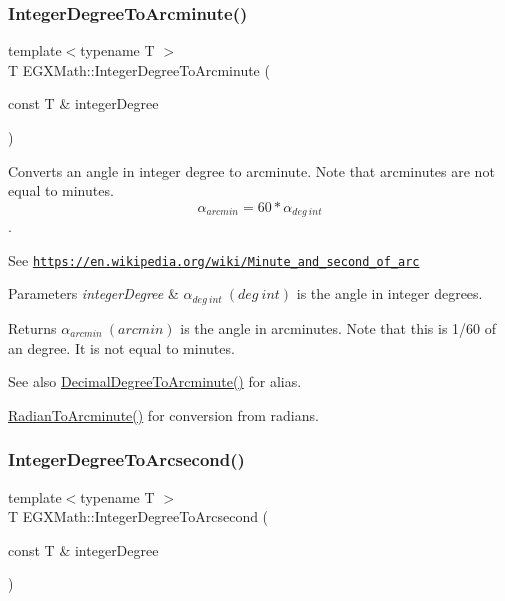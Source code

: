 \subsubsection{\texorpdfstring{Integer\+Degree\+To\+Arcminute()}{IntegerDegreeToArcminute()}}
{\footnotesize\ttfamily template$<$typename T $>$ \\
T E\+G\+X\+Math\+::\+Integer\+Degree\+To\+Arcminute (\begin{DoxyParamCaption}\item[{const T \&}]{integer\+Degree }\end{DoxyParamCaption})}



Converts an angle in integer degree to arcminute. Note that arcminutes are not equal to minutes. \[\alpha_{arcmin}= 60 * \alpha_{deg\ int}\]. 

See \href{https://en.wikipedia.org/wiki/Minute_and_second_of_arc}{\tt https\+://en.\+wikipedia.\+org/wiki/\+Minute\+\_\+and\+\_\+second\+\_\+of\+\_\+arc} 
\begin{DoxyParams}{Parameters}
{\em integer\+Degree} & $\alpha_{deg\ int}\ (deg\ int)$ is the angle in integer degrees. \\
\hline
\end{DoxyParams}
\begin{DoxyReturn}{Returns}
$\alpha_{arcmin}\ (arcmin)$ is the angle in arcminutes. Note that this is 1/60 of an degree. It is not equal to minutes. 
\end{DoxyReturn}
\begin{DoxySeeAlso}{See also}
\mbox{\hyperlink{group___e_g_x_math-_angle_conversions-_decimal_degree_ga6b6ea6e45d2a13f556824ca419cc9fbd}{Decimal\+Degree\+To\+Arcminute()}} for alias. 

\mbox{\hyperlink{group___e_g_x_math-_angle_conversions-_radian_ga722e3b8e78540a6b3942b73b64aeb8d2}{Radian\+To\+Arcminute()}} for conversion from radians. 
\end{DoxySeeAlso}
\mbox{\label{group___e_g_x_math-_angle_conversions-_integer_degree_gaa04058a2fea3dc3678264a05fac6e1ae}} 
\subsubsection{\texorpdfstring{Integer\+Degree\+To\+Arcsecond()}{IntegerDegreeToArcsecond()}}
{\footnotesize\ttfamily template$<$typename T $>$ \\
T E\+G\+X\+Math\+::\+Integer\+Degree\+To\+Arcsecond (\begin{DoxyParamCaption}\item[{const T \&}]{integer\+Degree }\end{DoxyParamCaption})}



